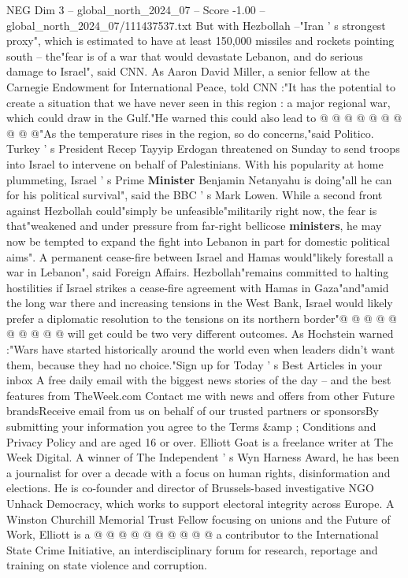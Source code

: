 \begin{textsample}{NEG Dim 3 – global\_north\_2024\_07 – Score -1.00 – global\_north\_2024\_07/111437537.txt}
But with Hezbollah --"Iran ' s strongest proxy", which is estimated to have at least 150,000 missiles and rockets pointing south -- the"fear is of a war that would devastate Lebanon, and do serious damage to Israel", said CNN.
As Aaron David Miller, a senior fellow at the Carnegie Endowment for International Peace, told CNN :"It has the potential to create a situation that we have never seen in this region : a major regional war, which could draw in the Gulf."He warned this could also lead to @ @ @ @ @ @ @ @ @ @"As the temperature rises in the region, so do concerns,"said Politico.
Turkey ' s President Recep Tayyip Erdogan threatened on Sunday to send troops into Israel to intervene on behalf of Palestinians.
With his popularity at home plummeting, Israel ' s Prime \textbf{Minister} Benjamin Netanyahu is doing"all he can for his political survival", said the BBC ' s Mark Lowen.
While a second front against Hezbollah could"simply be unfeasible"militarily right now, the fear is that"weakened and under pressure from far-right bellicose \textbf{ministers}, he may now be tempted to expand the fight into Lebanon in part for domestic political aims".
A permanent cease-fire between Israel and Hamas would"likely forestall a war in Lebanon", said Foreign Affairs.
Hezbollah"remains committed to halting hostilities if Israel strikes a cease-fire agreement with Hamas in Gaza"and"amid the long war there and increasing tensions in the West Bank, Israel would likely prefer a diplomatic resolution to the tensions on its northern border"@ @ @ @ @ @ @ @ @ @ will get could be two very different outcomes.
As Hochstein warned :"Wars have started historically around the world even when leaders didn't want them, because they had no choice."Sign up for Today ' s Best Articles in your inbox A free daily email with the biggest news stories of the day -- and the best features from TheWeek.com Contact me with news and offers from other Future brandsReceive email from us on behalf of our trusted partners or sponsorsBy submitting your information you agree to the Terms \&amp ; Conditions and Privacy Policy and are aged 16 or over.
Elliott Goat is a freelance writer at The Week Digital.
A winner of The Independent ' s Wyn Harness Award, he has been a journalist for over a decade with a focus on human rights, disinformation and elections.
He is co-founder and director of Brussels-based investigative NGO Unhack Democracy, which works to support electoral integrity across Europe.
A Winston Churchill Memorial Trust Fellow focusing on unions and the Future of Work, Elliott is a @ @ @ @ @ @ @ @ @ @ a contributor to the International State Crime Initiative, an interdisciplinary forum for research, reportage and training on state violence and corruption.

\end{textsample}
